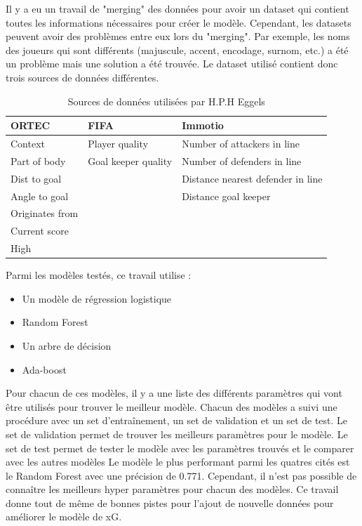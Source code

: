 \documentclass[12pt]{article}
\begin{document}
Il y a eu un travail de "merging" des données pour avoir un dataset qui contient toutes les informations nécessaires pour créer le modèle. 
Cependant, les datasets peuvent avoir des problèmes entre eux lors du "merging". 
Par exemple, les noms des joueurs qui sont différents (majuscule, accent, encodage, surnom, etc.) a été un problème mais une solution a été trouvée.
\newline
Le dataset utilisé contient donc trois sources de données différentes.
\begin{table}[htp]
    \centering
    \begin{tabular}{lll}
    \hline
    \textbf{ORTEC}  & \textbf{FIFA}       & \textbf{Immotio}                  \\ \hline
    Context         & Player quality      & Number of attackers in line       \\
    Part of body    & Goal keeper quality & Number of defenders in line       \\
    Dist to goal    &                     & Distance nearest defender in line \\
    Angle to goal   &                     & Distance goal keeper              \\
    Originates from &                     &                                   \\
    Current score   &                     &                                   \\
    High            &                     &                                   \\ \hline
    \end{tabular}
    \caption{Sources de données utilisées par H.P.H Eggels}
\end{table}
\newpage
Parmi les modèles testés, ce travail utilise :
\begin{itemize}
    \item Un modèle de régression logistique
    \item Random Forest
    \item Un arbre de décision
    \item Ada-boost
\end{itemize}
Pour chacun de ces modèles, il y a une liste des différents paramètres qui vont être utilisés pour trouver le meilleur modèle.
Chacun des modèles a suivi une procédure avec un set d'entraînement, un set de validation et un set de test.
Le set de validation permet de trouver les meilleurs paramètres pour le modèle.
Le set de test permet de tester le modèle avec les paramètres trouvés et le comparer avec les autres modèles
Le modèle le plus performant parmi les quatres cités est le Random Forest avec une précision de 0.771.
Cependant, il n'est pas possible de connaître les meilleurs hyper paramètres pour chacun des modèles.
Ce travail donne tout de même de bonnes pistes pour l'ajout de nouvelle données pour améliorer le modèle de xG.
\newpage
\end{document}
